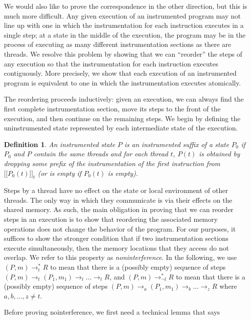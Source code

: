 \documentclass[preprint, 10pt]{sigplanconf}
\newcommand{\meanl}{\ensuremath{[ \! [}}
\newcommand{\meanr}{\ensuremath{] \! ]}}
\newcommand{\means}[1]{\ensuremath{\meanl #1 \meanr}}
\newcommand{\instr}[2]{\ensuremath{\means{#2}_{#1}}}
\newcommand{\cfg}[2]{\ensuremath{(#1, #2)}}
\newcommand{\execstart}[4]{\ensuremath{\cfg{#1}{#2} \rightarrow^{*}_{#3} #4}}
\newcommand{\execstarm}[4]{\ensuremath{\cfg{#1}{#2} \rightarrow^{*}_{\neg #3} #4}}
\newtheorem{definition}{Definition}
\begin{document}
We would also like to prove the correspondence in the other direction, but this is much more difficult. Any given execution of an instrumented program may not line up with one in which the instrumentation for each instruction executes in a single step; at a state in the middle of the execution, the program may be in the process of executing as many different instrumentation sections as there are threads. We resolve this problem by showing that we can ``reorder'' the steps of any execution so that the instrumentation for each instruction executes contiguously. More precisely, we show that each execution of an instrumented program is equivalent to one in which the instrumentation executes atomically.

The reordering proceeds inductively: given an execution, we can always find the first complete instrumentation section, move its steps to the front of the execution, and then continue on the remaining steps. We begin by defining the uninstrumented state represented by each intermediate state of the execution.
\begin{definition}An instrumented state $P$ is an \emph{instrumented suffix} of a state $P_0$ if $P_0$ and $P$ contain the same threads and for each thread $t$, $P(t)$ is obtained by dropping some prefix of the instrumentation of the first instruction from $\instr{t}{P_0(t)}$ (or is empty if $P_0(t)$ is empty).\end{definition}

Steps by a thread have no effect on the state or local environment of other threads. The only way in which they communicate is via their effects on the shared memory. As such, the main obligation in proving that we can reorder steps in an execution is to show that reordering the associated memory operations does not change the behavior of the program. For our purposes, it suffices to show the stronger condition that if two instrumentation sections execute simultaneously, then the memory locations that they access do not overlap. We refer to this property as \emph{noninterference}. In the following, we use $\execstart{P}{m}{t}{R}$ to mean that there is a (possibly empty) sequence of steps $(P, m) \rightarrow_t (P_1, m_1) \rightarrow_t ... \rightarrow_t R$, and $\execstarm{P}{m}{t}{R}$ to mean that there is a (possibly empty) sequence of steps $(P, m) \rightarrow_a (P_1, m_1) \rightarrow_b ... \rightarrow_z R$ 
where $a, b, ..., z \neq t$. 

Before proving nointerference, we first need a technical lemma that says 
\end{document}
